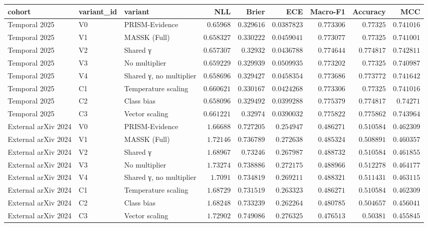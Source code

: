 \begin{tabular}{lllrrrrrr}
\toprule
cohort & variant\_id & variant & NLL & Brier & ECE & Macro-F1 & Accuracy & MCC \\
\midrule
Temporal 2025 & V0 & PRISM-Evidence & $0.65968$ & $0.329616$ & $0.0387823$ & $0.773306$ & $0.77325$ & $0.741016$ \\
Temporal 2025 & V1 & MASSK (Full) & $0.658327$ & $0.330222$ & $0.0459041$ & $0.773077$ & $0.77325$ & $0.741001$ \\
Temporal 2025 & V2 & Shared γ & $0.657307$ & $0.32932$ & $0.0436788$ & $0.774644$ & $0.774817$ & $0.742811$ \\
Temporal 2025 & V3 & No multiplier & $0.659229$ & $0.329939$ & $0.0509935$ & $0.773202$ & $0.77325$ & $0.740987$ \\
Temporal 2025 & V4 & Shared γ, no multiplier & $0.658696$ & $0.329427$ & $0.0458354$ & $0.773686$ & $0.773772$ & $0.741642$ \\
Temporal 2025 & C1 & Temperature scaling & $0.660621$ & $0.330167$ & $0.0424268$ & $0.773306$ & $0.77325$ & $0.741016$ \\
Temporal 2025 & C2 & Class bias & $0.658096$ & $0.329492$ & $0.0399288$ & $0.775379$ & $0.774817$ & $0.74271$ \\
Temporal 2025 & C3 & Vector scaling & $0.661221$ & $0.32974$ & $0.0390032$ & $0.775822$ & $0.775862$ & $0.743964$ \\
External arXiv 2024 & V0 & PRISM-Evidence & $1.66688$ & $0.727205$ & $0.254947$ & $0.486271$ & $0.510584$ & $0.462309$ \\
External arXiv 2024 & V1 & MASSK (Full) & $1.72146$ & $0.736789$ & $0.272638$ & $0.485324$ & $0.508891$ & $0.460357$ \\
External arXiv 2024 & V2 & Shared γ & $1.68967$ & $0.73246$ & $0.267987$ & $0.488732$ & $0.510584$ & $0.461855$ \\
External arXiv 2024 & V3 & No multiplier & $1.73274$ & $0.738886$ & $0.272175$ & $0.488966$ & $0.512278$ & $0.464177$ \\
External arXiv 2024 & V4 & Shared γ, no multiplier & $1.7091$ & $0.734819$ & $0.269211$ & $0.488321$ & $0.511431$ & $0.463115$ \\
External arXiv 2024 & C1 & Temperature scaling & $1.68729$ & $0.731519$ & $0.263323$ & $0.486271$ & $0.510584$ & $0.462309$ \\
External arXiv 2024 & C2 & Class bias & $1.68248$ & $0.733239$ & $0.262264$ & $0.480785$ & $0.504657$ & $0.456041$ \\
External arXiv 2024 & C3 & Vector scaling & $1.72902$ & $0.749086$ & $0.276325$ & $0.476513$ & $0.50381$ & $0.455845$ \\
\bottomrule
\end{tabular}
